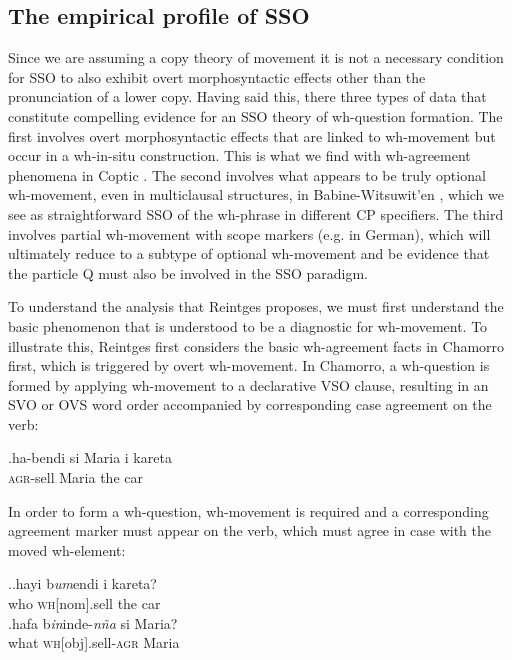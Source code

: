 \documentclass{glossa}
\begin{document}
\subsection{The empirical profile of SSO}
Since we are assuming a copy theory of movement it is not a necessary condition for SSO to also exhibit overt morphosyntactic effects other than the pronunciation of a lower copy. Having said this, there three types of data that constitute compelling evidence for an SSO theory of wh-question formation. The first involves overt morphosyntactic effects that are linked to wh-movement but occur in a wh-in-situ construction.  This is what we find with wh-agreement phenomena in Coptic \citep{rlc:2006,reintges:2007}. The second involves what appears to be truly optional wh-movement, even in multiclausal structures, in Babine-Witsuwit'en \citep{denham:1997,denham:2000}, which we see as straightforward SSO of the wh-phrase in different CP specifiers. The third involves partial wh-movement with scope markers (e.g. in German), which will ultimately reduce to a subtype of optional wh-movement and be evidence that the particle Q must also be involved in the SSO paradigm.

To understand the analysis that Reintges proposes, we must first understand the basic phenomenon that is understood to be a diagnostic for wh-movement. To illustrate this, Reintges first considers the basic wh-agreement facts in Chamorro first, which is triggered by overt wh-movement. In Chamorro, a wh-question is formed by applying wh-movement to a declarative VSO clause, resulting in an SVO or OVS word order accompanied by corresponding case agreement on the verb:

\exg.\label{wh.110}ha-bendi si Maria i kareta\\
   \textsc{agr}-sell {} Maria the car\\

In order to form a wh-question, wh-movement is required and a corresponding agreement marker must appear on the verb, which must agree in case with the moved wh-element:

\ex.\ag.\label{wh.120a}hayi b\textit{um}endi i kareta?\\
   who \textsc{wh}[nom].sell the car\\
   \bg.\label{wh.120b}hafa b\textit{in}inde-\textit{n\~na} si Maria?\\
   what \textsc{wh}[obj].sell-\textsc{agr} {} Maria\\
\end{document}
